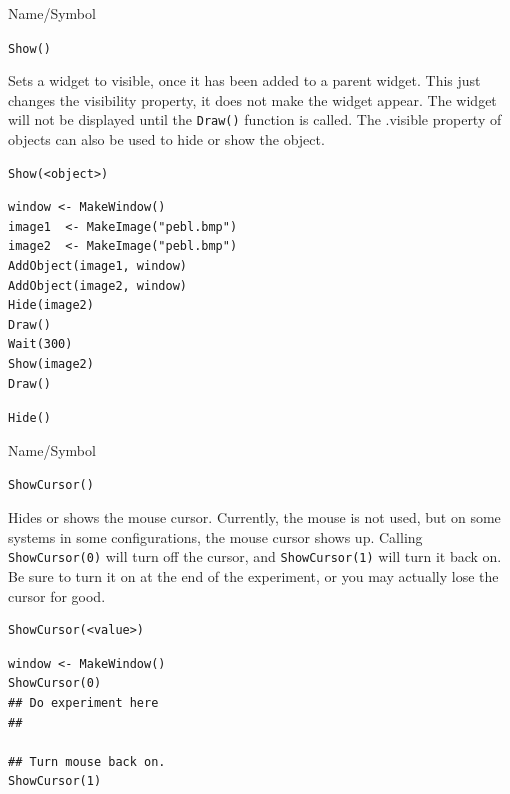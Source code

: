 \begin{desc}{Name/Symbol}
\item[Name/Symbol]  	\verb+Show()+

\item[Description] Sets a widget to visible, once it has been added to
  a parent widget.  This just changes the visibility property, it does
  not make the widget appear.  The widget will not be displayed until
  the \verb+Draw()+ function is called.  The .visible property of
objects can also be used to hide or show the object.

\item[Usage]
\begin{verbatim}
Show(<object>)
\end{verbatim}

\item[Example]
\begin{verbatim}
window <- MakeWindow()
image1  <- MakeImage("pebl.bmp")
image2  <- MakeImage("pebl.bmp")
AddObject(image1, window)
AddObject(image2, window)
Hide(image2)
Draw()
Wait(300)
Show(image2)
Draw()
\end{verbatim}

\item[See Also]     	\verb+Hide()+
\end{desc}



\begin{desc}{Name/Symbol}
\item[Name/Symbol]  	\verb+ShowCursor()+

\item[Description] Hides or shows the mouse cursor.  Currently, the
  mouse is not used, but on some systems in some configurations, the
  mouse cursor shows up.  Calling \verb+ShowCursor(0)+ will turn off the
  cursor, and \verb+ShowCursor(1)+ will turn it back on.  Be sure to turn it
  on at the end of the experiment, or you may actually lose the cursor
  for good.

\item[Usage]
\begin{verbatim}
ShowCursor(<value>)
\end{verbatim}

\item[Example]
\begin{verbatim}
window <- MakeWindow()
ShowCursor(0)
## Do experiment here
##

## Turn mouse back on.
ShowCursor(1)
\end{verbatim}
\item[See Also] 
\end{desc}



